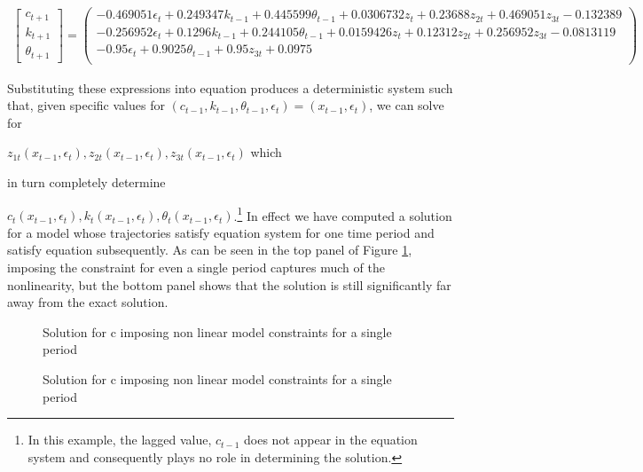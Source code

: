 \documentclass[12pt]{article}
\begin{document}
{\tiny
\begin{gather*}
  \begin{bmatrix}
c_{t+1}\\k_{t+1}\\ \theta_{t+1}
  \end{bmatrix}=%
  \left(
   \begin{array}{c}
    -0.469051 \epsilon _t+0.249347 k_{t-1}+0.445599 \theta _{t-1}+0.0306732
      z_t+0.23688 z_{2 t}+0.469051 z_{3 t}-0.132389 \\
    -0.256952 \epsilon _t+0.1296 k_{t-1}+0.244105 \theta _{t-1}+0.0159426
      z_t+0.12312 z_{2 t}+0.256952 z_{3 t}-0.0813119 \\
    -0.95 \epsilon _t+0.9025 \theta _{t-1}+0.95 z_{3 t}+0.0975 \\
   \end{array}
   \right)
\end{gather*}}

Substituting  these expressions into equation  produces
a deterministic system such that, given specific values for 
$(c_{t-1}, k_{t-1}, \theta_{t-1}, \epsilon_t)=(x_{t-1},\epsilon_{t})$, we can solve for 

$z_{1t}(x_{t-1},\epsilon_{t}), z_{2t}(x_{t-1},\epsilon_{t}), z_{3t}(x_{t-1},\epsilon_{t})$ which 

in turn completely determine 

$c_{t}(x_{t-1},\epsilon_{t}), k_{t}(x_{t-1},\epsilon_{t}),\theta_{t}(x_{t-1},\epsilon_{t})$.\footnote{In this example, the lagged value,  $c_{t-1}$ does not appear in the equation system and consequently plays no role in determining the solution.}  In effect we have 
computed a solution for a model whose trajectories satisfy equation system 
for one time period and satisfy equation  subsequently. As can
be seen in the top panel of Figure \ref{fig:cfuncfirst}, 
imposing the constraint for even a single period captures much of the nonlinearity, but the bottom panel shows that the solution is 
still significantly far away from the exact solution.

\begin{figure}
  \centering
  \caption{Solution for c imposing non linear model constraints for a single period}
  \caption{Solution for c imposing non linear model constraints for a single period}
  \label{fig:cfuncfirst}
\end{figure}
\end{document}
